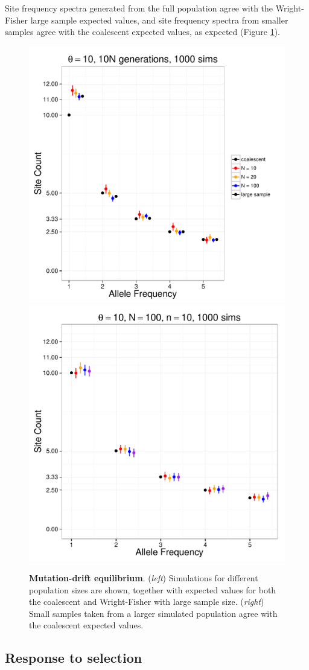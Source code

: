 \documentclass{article}
\begin{document}
Site frequency spectra generated from the full population agree with the
Wright-Fisher large sample expected values, and site frequency spectra from
smaller samples agree with the coalescent expected values, as expected (Figure
\ref{figure_validation_mutation_drift}).

\begin{figure}[H]
    \begin{center}
        \includegraphics[width=.49\textwidth]{fig/validation_mutation_drift_large_sample.pdf}
        \includegraphics[width=.49\textwidth]{fig/validation_mutation_drift_small_sample.pdf}
    \end{center}
    \caption{{\bf Mutation-drift equilibrium}.  
            (\emph{left}) Simulations for different population sizes are shown, together
        with expected values for both the coalescent and Wright-Fisher with large sample size.
        (\emph{right}) Small samples taken from a larger simulated population agree with
        the coalescent expected values.}
    \label{figure_validation_mutation_drift}
\end{figure}


\subsection{Response to selection}
\end{document}
